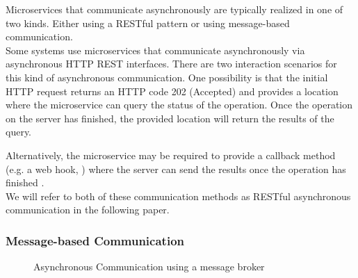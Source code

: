 Microservices that communicate asynchronously are typically realized in one of two kinds.
Either using a RESTful pattern or using message-based communication. \\

Some systems use microservices that communicate asynchronously via asynchronous HTTP REST interfaces.
There are two interaction scenarios for this kind of asynchronous communication.
One possibility is that the initial HTTP request returns an HTTP code 202 (Accepted) and provides a location where the microservice can query the status of the operation.
Once the operation on the server has finished, the provided location will return the results of the query. \cite{Mayer2018}

Alternatively, the microservice may be required to provide a callback method (e.g. a web hook, \cite{Webhooks}) where the server can send the results once the operation has finished \cite{Mayer2018}. \\

We will refer to both of these communication methods as RESTful asynchronous communication in the following paper.


\subsubsection{Message-based Communication}
\label{sec:Foundation:AsyncCommunication:MBC}

\begin{figure}
\centering
{}
\caption{Asynchronous Communication using a message broker}
\label{fig:ImageAsyncMBC}
\end{figure}

